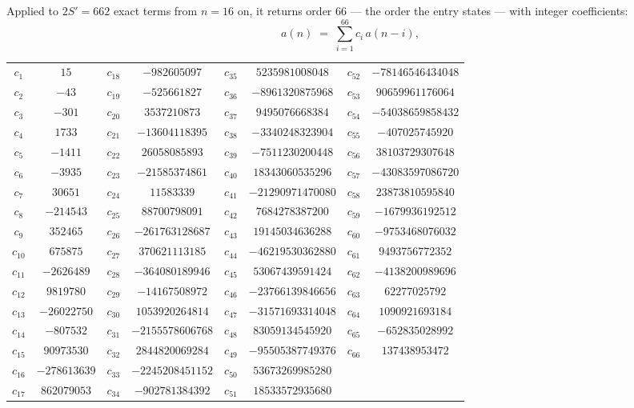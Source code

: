 \documentclass[11pt,a4paper]{article}
\theoremstyle{plain}
\theoremstyle{definition}
\begin{document}
Applied to $2S'=662$ exact terms from $n=16$ on, it returns order $66$ --- the
order the entry states --- with integer coefficients:
\[
a(n)\;=\;\sum_{i=1}^{66}c_i\,a(n-i),
\]
\begin{center}\small
\begin{tabular}{cccccccc}
$c_{1}$ & $15$ & $c_{18}$ & $-982605097$ & $c_{35}$ & $5235981008048$ & $c_{52}$ & $-78146546434048$ \\
$c_{2}$ & $-43$ & $c_{19}$ & $-525661827$ & $c_{36}$ & $-8961320875968$ & $c_{53}$ & $90659961176064$ \\
$c_{3}$ & $-301$ & $c_{20}$ & $3537210873$ & $c_{37}$ & $9495076668384$ & $c_{54}$ & $-54038659858432$ \\
$c_{4}$ & $1733$ & $c_{21}$ & $-13604118395$ & $c_{38}$ & $-3340248323904$ & $c_{55}$ & $-407025745920$ \\
$c_{5}$ & $-1411$ & $c_{22}$ & $26058085893$ & $c_{39}$ & $-7511230200448$ & $c_{56}$ & $38103729307648$ \\
$c_{6}$ & $-3935$ & $c_{23}$ & $-21585374861$ & $c_{40}$ & $18343060535296$ & $c_{57}$ & $-43083597086720$ \\
$c_{7}$ & $30651$ & $c_{24}$ & $11583339$ & $c_{41}$ & $-21290971470080$ & $c_{58}$ & $23873810595840$ \\
$c_{8}$ & $-214543$ & $c_{25}$ & $88700798091$ & $c_{42}$ & $7684278387200$ & $c_{59}$ & $-1679936192512$ \\
$c_{9}$ & $352465$ & $c_{26}$ & $-261763128687$ & $c_{43}$ & $19145034636288$ & $c_{60}$ & $-9753468076032$ \\
$c_{10}$ & $675875$ & $c_{27}$ & $370621113185$ & $c_{44}$ & $-46219530362880$ & $c_{61}$ & $9493756772352$ \\
$c_{11}$ & $-2626489$ & $c_{28}$ & $-364080189946$ & $c_{45}$ & $53067439591424$ & $c_{62}$ & $-4138200989696$ \\
$c_{12}$ & $9819780$ & $c_{29}$ & $-14167508972$ & $c_{46}$ & $-23766139846656$ & $c_{63}$ & $62277025792$ \\
$c_{13}$ & $-26022750$ & $c_{30}$ & $1053920264814$ & $c_{47}$ & $-31571693314048$ & $c_{64}$ & $1090921693184$ \\
$c_{14}$ & $-807532$ & $c_{31}$ & $-2155578606768$ & $c_{48}$ & $83059134545920$ & $c_{65}$ & $-652835028992$ \\
$c_{15}$ & $90973530$ & $c_{32}$ & $2844820069284$ & $c_{49}$ & $-95505387749376$ & $c_{66}$ & $137438953472$ \\
$c_{16}$ & $-278613639$ & $c_{33}$ & $-2245208451152$ & $c_{50}$ & $53673269985280$ &  &  \\
$c_{17}$ & $862079053$ & $c_{34}$ & $-902781384392$ & $c_{51}$ & $18533572935680$ &  &  \\
\end{tabular}
\end{center}
\end{document}
